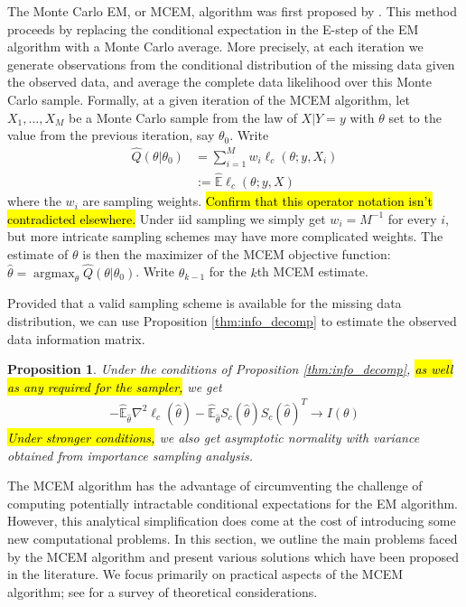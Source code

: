 \documentclass[11pt, oneside]{article}   	%
\newcommand{\bE}{\mathbb{E}}
\DeclareMathOperator*{\argmax}{argmax}
\newtheorem{proposition}{Proposition}[section]
\begin{document}
The Monte Carlo EM, or MCEM, algorithm was first proposed by \citet{Wei90}. This method proceeds by replacing the conditional expectation in the E-step of the EM algorithm with a Monte Carlo average. More precisely, at each iteration we generate observations from the conditional distribution of the missing data given the observed data, and average the complete data likelihood over this Monte Carlo sample. Formally, at a given iteration of the MCEM algorithm, let $X_1,\ldots, X_M$ be a Monte Carlo sample from the law of $X|Y=y$ with $\theta$ set to the value from the previous iteration, say $\theta_0$. Write
%
\begin{align}
    \hat{Q}(\theta|\theta_0) &= \sum_{i=1}^M w_i \ell_c(\theta; y, X_i)\\
    &:= \hat{\bE} \ell_c (\theta; y, X)
\end{align}
%
where the $w_i$ are sampling weights. \hl{Confirm that this operator notation isn't contradicted elsewhere.} Under iid sampling we simply get $w_i = M^{-1}$ for every $i$, but more intricate sampling schemes may have more complicated weights. The estimate of $\theta$ is then the maximizer of the MCEM objective function: $\hat{\theta} = \argmax_\theta \hat{Q}(\theta|\theta_0)$. Write $\hat{\theta}_{k-1}$ for the $k$th MCEM estimate. 

Provided that a valid sampling scheme is available for the missing data distribution, we can use Proposition \ref{thm:info_decomp} to estimate the observed data information matrix. 

\begin{proposition}
    Under the conditions of Proposition \ref{thm:info_decomp}, \hl{as well as any required for the sampler,} we get
    \begin{align}
        - \hat{\bE}_{\hat{\theta}} \nabla^2 \ell_c(\hat{\theta}) - \hat{\bE}_{\hat{\theta}} S_c(\hat{\theta}) S_c(\hat{\theta})^T \rightarrow I(\theta)
    \end{align}
    \hl{Under stronger conditions,} we also get asymptotic normality with variance obtained from importance sampling analysis.
\end{proposition}

The MCEM algorithm has the advantage of circumventing the challenge of computing potentially intractable conditional expectations for the EM algorithm. However, this analytical simplification does come at the cost of introducing some new computational problems. In this section, we outline the main problems faced by the MCEM algorithm and present various solutions which have been proposed in the literature. We focus primarily on practical aspects of the MCEM algorithm; see \citet{Nea13} for a survey of theoretical considerations.
\end{document}
